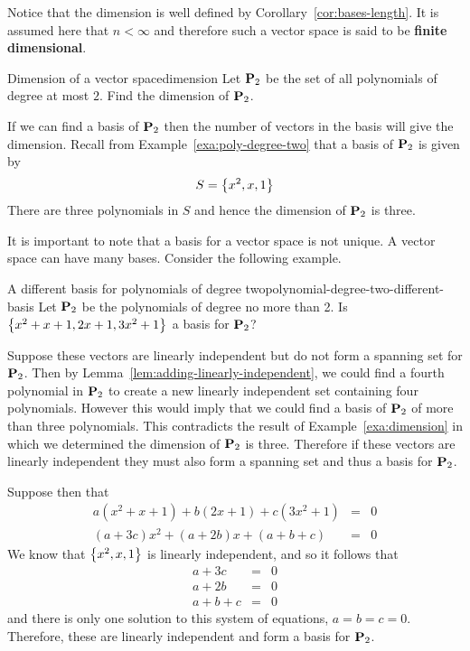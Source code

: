 Notice that the dimension is well defined by Corollary~\ref{cor:bases-length}. It is assumed here
that $n<\infty $ and therefore such a vector space is said to be \textbf{finite
dimensional}.

\begin{example}{Dimension of a vector space}{dimension}
Let $\mathbf{P}_2$ be the set of all polynomials of degree at most $2$. Find the dimension of $\mathbf{P}_2$.
\end{example}

\begin{solution}
If we can find a basis of $\mathbf{P}_2$ then the number of vectors in the basis will give the dimension. Recall from Example~\ref{exa:poly-degree-two} that a basis of $\mathbf{P}_2$ is given by
\[
S  = \left\{x^2, x, 1 \right\}
\]
There are three polynomials in $S$ and hence the dimension of $\mathbf{P}_2$ is three.
\end{solution}

It is important to note that a basis for a vector space is not unique. A vector space can have many bases. Consider the following example.

\begin{example}{A different basis for polynomials of degree two}{polynomial-degree-two-different-basis}
Let $\mathbf{P}_2$ be the polynomials of degree no more than 2. Is $\left\{
x^{2}+x+1,2x+1,3x^{2}+1\right\} $ a basis for $\mathbf{P}_2$?
\end{example}

\begin{solution}
Suppose these vectors are linearly independent but do not form a spanning set for $\mathbf{P}_2$. Then by Lemma~\ref{lem:adding-linearly-independent}, we could find a fourth polynomial in $\mathbf{P}_2$ to create a new linearly independent
set containing four polynomials. However this would imply that we could find a basis of $\mathbf{P}_2$ of more than three polynomials. This contradicts the result of Example~\ref{exa:dimension} in which we determined the dimension of $\mathbf{P}_2$ is three.  Therefore if these vectors are linearly independent they must also form a spanning set and thus a basis for $\mathbf{P}_2$.

Suppose then that
\begin{eqnarray*}
a(x^{2}+x+1) +b(2x+1) +c(3x^{2}+1) &=& 0\\
(a+3c) x^{2}+(a+2b) x+(a+b+c) &=& 0
\end{eqnarray*}
We know that $\left\{x^2, x, 1 \right\}$ is linearly independent, and so it follows that
\begin{eqnarray*}
a+3c &=& 0 \\
a+2b &=& 0 \\
a+b+c &=& 0
\end{eqnarray*}
and there is only one solution to this system of equations, $a=b=c=0$.
Therefore, these are linearly independent and form a basis for $\mathbf{P}_2$.
\end{solution}

